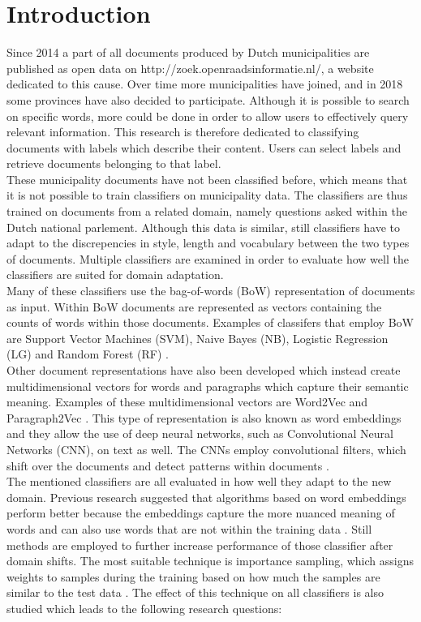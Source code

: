 \section{Introduction}
\label{sec:intro}
Since 2014 a part of all documents produced by Dutch municipalities are published as open data on http://zoek.openraadsinformatie.nl/, a website dedicated to this cause. Over time more municipalities have joined, and in 2018 some provinces have also decided to participate. Although it is possible to search on specific words, more could be done in order to allow users to effectively query relevant information. This research is therefore dedicated to classifying documents with labels which describe their content. Users can select labels and retrieve documents belonging to that label.\\
These municipality documents have not been classified before, which means that it is not possible to train classifiers on municipality data. The classifiers are thus trained on documents from a related domain, namely questions asked within the Dutch national parlement. Although this data is similar, still classifiers have to adapt to the discrepencies in style, length and vocabulary between the two types of documents. Multiple classifiers are examined in order to evaluate how well the classifiers are suited for domain adaptation.\\
Many of these classifiers use the bag-of-words (BoW) representation of documents as input. Within BoW documents are  represented as vectors containing the counts of words within those documents. Examples of classifers that employ BoW are Support Vector Machines (SVM), Naive Bayes (NB), Logistic Regression (LG) and Random Forest (RF) \cite{aggarwal2012survey}. \\
Other document representations have also been developed which instead create multidimensional vectors for words and paragraphs which capture their semantic meaning. Examples of these multidimensional vectors are Word2Vec \cite{mikolov2013efficient} and Paragraph2Vec \cite{le2014distributed}. This type of representation is also known as word embeddings and they allow the use of deep neural networks, such as Convolutional Neural Networks (CNN), on text as well. The CNNs employ convolutional filters, which shift over the documents and detect patterns within documents \cite{kim2014convolutional} \cite{kalchbrenner2014convolutional}.\\
The mentioned classifiers are all evaluated in how well they adapt to the new domain. Previous research suggested that algorithms based on word embeddings perform better because the embeddings capture the more nuanced meaning of words and can also use words that are not within the training data \cite{nguyen2015event} \cite{mou2016transferable}. Still methods are employed to further increase performance of those classifier after domain shifts. The most suitable technique is importance sampling, which assigns weights to samples during the training based on how much the samples are similar to the test data \cite{pan2010survey}. The effect of this technique on all classifiers is also studied which leads to the following research questions:
